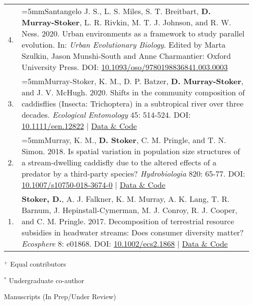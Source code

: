 \documentclass[letterpaper,11pt,oneside]{article}
\begin{document}
\begin{longtable}{@{} p{0.5cm} >{\raggedright\arraybackslash}p{16.7cm}}
4. & \hangindent=5mmSantangelo J. S., L. S. Miles, S. T. Breitbart, \textbf{D. Murray-Stoker}, L. R. Rivkin, M. T. J. Johnson, and R. W. Ness. 2020. Urban environments as a framework to study parallel evolution. In: \textit{Urban Evolutionary Biology}. Edited by Marta Szulkin, Jason Munshi-South and Anne Charmantier: Oxford University Press. DOI: {\href{https://oxford.universitypressscholarship.com/view/10.1093/oso/9780198836841.001.0001/oso-9780198836841-chapter-3}{10.1093/oso/9780198836841.003.0003}} \\
3. & \hangindent=5mmMurray-Stoker, K. M., D. P. Batzer, \textbf{D. Murray-Stoker}, and J. V. McHugh. 2020. Shifts in the community composition of caddisflies (Insecta: Trichoptera) in a subtropical river over three decades. \textit{Ecological Entomology} 45: 514-524. DOI: {\href{https://resjournals.onlinelibrary.wiley.com/doi/full/10.1111/een.12822}{10.1111/een.12822}} | {\href{https://doi.org/10.6084/m9.figshare.14237687.v1}{Data \& Code}} \\
2. & \hangindent=5mmMurray, K. M., \textbf{D. Stoker}, C. M. Pringle, and T. N. Simon. 2018. Is spatial variation in population size structures of a stream-dwelling caddisfly due to the altered effects of a predator by a third-party species? \textit{Hydrobiologia} 820: 65-77. DOI: {\href{https://link.springer.com/article/10.1007/s10750-018-3674-0}{10.1007/s10750-018-3674-0}} | {\href{https://doi.org/10.6084/m9.figshare.5856651.v1}{Data \& Code}} \\
1. & \hangindent=5mm\textbf{Stoker, D.}, A. J. Falkner, K. M. Murray, A. K. Lang, T. R. Barnum, J. Hepinstall-Cymerman, M. J. Conroy, R. J. Cooper, and C. M. Pringle. 2017. Decomposition of terrestrial resource subsidies in headwater streams: Does consumer diversity matter? \textit{Ecosphere} 8: e01868. DOI: {\href{https://esajournals.onlinelibrary.wiley.com/doi/full/10.1002/ecs2.1868}{10.1002/ecs2.1868}} | {\href{https://doi.org/10.6084/m9.figshare.6025811.v1}{Data \& Code}} \\
\end{longtable}

 \smallskip
 \noindent $^{+}$ Equal contributors
 
  \smallskip
 \noindent $^{*}$ Undergraduate co-author

\bigskip





\noindent\Large{Manuscripts (In Prep/Under Review)} 
\normalsize
\bigskip
\end{document}
